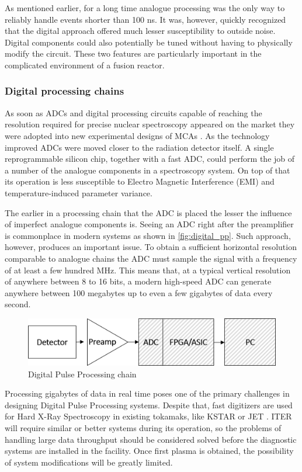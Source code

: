 As mentioned earlier, for a long time analogue processing 
was the only way to reliably handle events shorter than 100 ns. 
It was, however, quickly recognized
that the digital approach offered 
much lesser susceptibility to outside noise. 
Digital components could also potentially be tuned without
having to physically modify the circuit.
These two features are particularly important in the 
complicated environment of a fusion reactor.
\cite{analog_vs_digital_1998}

\subsubsection{Digital processing chains}

As soon as ADCs and digital processing circuits capable of
reaching the resolution required for precise nuclear
spectroscopy appeared on the market they were 
adopted into new experimental designs of MCAs \cite{mca_fpga}.
As the technology improved ADCs were moved closer to the 
radiation detector itself.
A single reprogrammable silicon chip, together with a fast ADC,
could perform the job of a number of the analogue components
in a spectroscopy system.
On top of that its operation is less susceptible to Electro Magnetic
Interference (EMI) and temperature-induced parameter variance.
\cite{dpp_walewski}


The earlier in a processing chain that the ADC is placed the
lesser the influence of imperfect analogue components is.
Seeing an ADC right after the preamplifier is commonplace
in modern systems as shown in \autoref{fig:digital_pp}.
Such approach, however, produces an important issue.
To obtain a sufficient horizontal resolution comparable to analogue chains
the ADC must sample the signal with a frequency of at least
a few hundred MHz. This means that, at a typical vertical resolution
of anywhere between 8 to 16 bits, a modern high-speed ADC
can generate anywhere between 100 megabytes 
up to even a few gigabytes of data every second.
\cite{dpp_walewski}
\begin{figure}[H]
  \centering
  \includegraphics[width=.7\linewidth]{media/digital_pulse_processing.png}
  \caption{Digital Pulse Processing chain}
  \label{fig:digital_pp}
\end{figure}

Processing gigabytes of data in real time poses one of 
the primary challenges in designing Digital Pulse Processing systems.
Despite that, fast digitizers are used for Hard X-Ray Spectroscopy
in existing tokamaks, like KSTAR or JET \cite{hxrm_jet, kstar_upgrade}.
ITER will require similar or better systems during its operation,
so the problems of handling large data throughput
should be considered solved before the diagnostic systems
are installed in the facility. Once first plasma is obtained,
the possibility of system modifications will be greatly limited.
 


